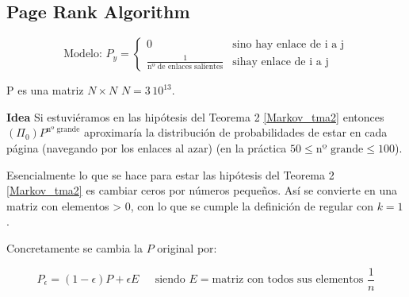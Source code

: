 \subsection{Page Rank Algorithm}

\begin{center}
\end{center}


$$\text{Modelo: } P_y = \left\{
	\begin{array}{ll}
		0  & \mbox{si} \text{no hay enlace de i a j} \\
		\frac{1}{\text{nº de enlaces salientes}} & \mbox{si} \text{hay enlace de i a j}
	\end{array}
\right.
$$

P es una matriz $N \times N$ $N = 3 \, 10^{13}$.

\textbf{Idea} Si estuviéramos en las hipótesis del Teorema 2 \ref{Markov_tma2} entonces  $(\Pi_0) P^{\text{nº grande}}$ aproximaría la distribución de probabilidades de estar en cada página (navegando por los enlaces al azar) (en la práctica $50 \leq \text{nº grande} \leq 100$).


Esencialmente lo que se hace para estar las hipótesis del Teorema 2 \ref{Markov_tma2} es cambiar ceros por números pequeños. Así se convierte en una matriz con elementos > 0, con lo que se cumple la definición de regular con $k=1$.

Concretamente se cambia la $P$ original por:

$$P_{\epsilon} = (1-\epsilon) P + \epsilon E \;\;\;\; \text{ siendo }E = \text{matriz con todos sus elementos } \frac{1}{n}$$

